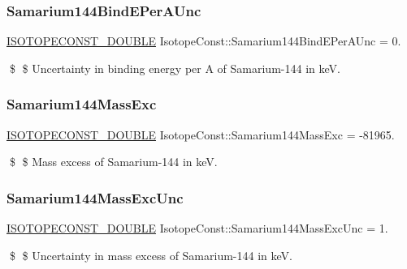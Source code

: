 \subsubsection{\texorpdfstring{Samarium144\+Bind\+E\+Per\+A\+Unc}{Samarium144BindEPerAUnc}}
{\footnotesize\ttfamily \mbox{\hyperlink{group___isotope_const-_macros_ga8f45a7272ce02c0b4c65c44636ed719a}{I\+S\+O\+T\+O\+P\+E\+C\+O\+N\+S\+T\+\_\+\+D\+O\+U\+B\+LE}} Isotope\+Const\+::\+Samarium144\+Bind\+E\+Per\+A\+Unc = 0.}

\$ \$ Uncertainty in binding energy per A of Samarium-\/144 in keV. \mbox{\label{group___isotope_const-_samarium-_sm144_gadcbb1aac81a3cf0262b153f72c2b6975}} 
\subsubsection{\texorpdfstring{Samarium144\+Mass\+Exc}{Samarium144MassExc}}
{\footnotesize\ttfamily \mbox{\hyperlink{group___isotope_const-_macros_ga8f45a7272ce02c0b4c65c44636ed719a}{I\+S\+O\+T\+O\+P\+E\+C\+O\+N\+S\+T\+\_\+\+D\+O\+U\+B\+LE}} Isotope\+Const\+::\+Samarium144\+Mass\+Exc = -\/81965.}

\$ \$ Mass excess of Samarium-\/144 in keV. \mbox{\label{group___isotope_const-_samarium-_sm144_ga82d81409899e659f23214b805f4ff55e}} 
\subsubsection{\texorpdfstring{Samarium144\+Mass\+Exc\+Unc}{Samarium144MassExcUnc}}
{\footnotesize\ttfamily \mbox{\hyperlink{group___isotope_const-_macros_ga8f45a7272ce02c0b4c65c44636ed719a}{I\+S\+O\+T\+O\+P\+E\+C\+O\+N\+S\+T\+\_\+\+D\+O\+U\+B\+LE}} Isotope\+Const\+::\+Samarium144\+Mass\+Exc\+Unc = 1.}

\$ \$ Uncertainty in mass excess of Samarium-\/144 in keV. \mbox{\label{group___isotope_const-_samarium-_sm144_ga1a59ca388e85da222f2d884f12c5cef4}} 
